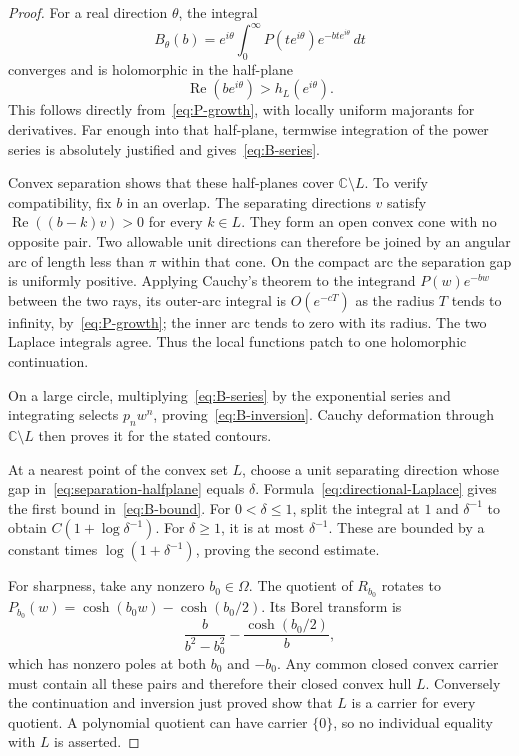 \documentclass[11pt,a4paper]{article}
\numberwithin{equation}{section}
\theoremstyle{definition}
\theoremstyle{remark}
\newcommand{\C}{\mathbb C}
\begin{document}
\begin{proof}
For a real direction $\theta$, the integral
\begin{equation}\label{eq:directional-Laplace}
 B_\theta(b)=e^{i\theta}\int_0^\infty
     P(te^{i\theta})e^{-bte^{i\theta}}\,dt
\end{equation}
converges and is holomorphic in the half-plane
\begin{equation}\label{eq:separation-halfplane}
 \operatorname{Re}(be^{i\theta})>h_L(e^{i\theta}).
\end{equation}
This follows directly from~\eqref{eq:P-growth}, with locally uniform majorants for derivatives. Far enough into that half-plane, termwise integration of the power series is absolutely justified and gives~\eqref{eq:B-series}.

Convex separation shows that these half-planes cover $\C\setminus L$. To verify compatibility, fix $b$ in an overlap. The separating directions $v$ satisfy
$\operatorname{Re}((b-k)v)>0$ for every $k\in L$. They form an open convex cone with no opposite pair. Two allowable unit directions can therefore be joined by an angular arc of length less than $\pi$ within that cone. On the compact arc the separation gap is uniformly positive. Applying Cauchy's theorem to the integrand $P(w)e^{-bw}$ between the two rays, its outer-arc integral is $O(e^{-cT})$ as the radius $T$ tends to infinity, by~\eqref{eq:P-growth}; the inner arc tends to zero with its radius. The two Laplace integrals agree. Thus the local functions patch to one holomorphic continuation.

On a large circle, multiplying~\eqref{eq:B-series} by the exponential series and integrating selects $p_nw^n$, proving~\eqref{eq:B-inversion}. Cauchy deformation through $\C\setminus L$ then proves it for the stated contours.

At a nearest point of the convex set $L$, choose a unit separating direction whose gap in~\eqref{eq:separation-halfplane} equals $\delta$. Formula~\eqref{eq:directional-Laplace} gives the first bound in~\eqref{eq:B-bound}. For $0<\delta\le1$, split the integral at $1$ and $\delta^{-1}$ to obtain $C(1+\log\delta^{-1})$. For $\delta\ge1$, it is at most $\delta^{-1}$. These are bounded by a constant times $\log(1+\delta^{-1})$, proving the second estimate.

For sharpness, take any nonzero $b_0\in\Omega$. The quotient of $R_{b_0}$ rotates to
$P_{b_0}(w)=\cosh(b_0w)-\cosh(b_0/2)$. Its Borel transform is
\[
 \frac{b}{b^2-b_0^2}-\frac{\cosh(b_0/2)}b,
\]
which has nonzero poles at both $b_0$ and $-b_0$. Any common closed convex carrier must contain all these pairs and therefore their closed convex hull $L$. Conversely the continuation and inversion just proved show that $L$ is a carrier for every quotient. A polynomial quotient can have carrier $\{0\}$, so no individual equality with $L$ is asserted.
\end{proof}
\end{document}
